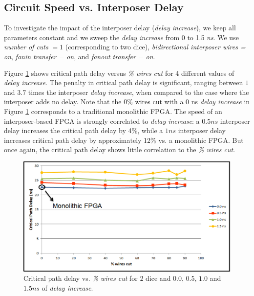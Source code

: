 \documentclass{sig-alternate-2013}
\begin{document}
\subsection{Circuit Speed vs. Interposer Delay}

To investigate the impact of the interposer delay (\textit{delay increase}), we keep all parameters constant and we sweep the \textit{delay increase} from 0 to 1.5 \textit{ns}. We use \textit{number of cuts} $= 1$ (corresponding to two dice), \textit{bidirectional interposer wires = on}, \textit{fanin transfer = on}, and \textit{fanout transfer = on}.

Figure \ref{fig:delays_crit} shows critical path delay versus \textit{\% wires cut} for 4 different values of \textit{delay increase}. The penalty in critical path delay is significant, ranging between $1$ and $3.7$ times the interposer \textit{delay increase}, when compared to the case where the interposer adds no delay. Note that the 0\% wires cut with a 0 ns \textit{delay increase} in Figure \ref{fig:delays_crit} corresponds to a traditional monolithic FPGA. The speed of an interposer-based FPGA is strongly correlated to \textit{delay increase}: a $0.5ns$ interposer delay increases the critical path delay by 4\%, while a $1ns$ interposer delay increases critical path delay by approximately 12\% vs. a monolithic FPGA. But once again, the critical path delay shows little correlation to the \textit{\% wires cut}.

\begin{figure}[!htbp]
\centering
\includegraphics[width=\linewidth]{delays_crit_path_new.eps}
\caption{Critical path delay vs. \textit{\% wires cut} for 2 dice and $0.0$, $0.5$, $1.0$ and $1.5ns$ of \textit{delay increase}.}
\label{fig:delays_crit}
\end{figure}
\end{document}
